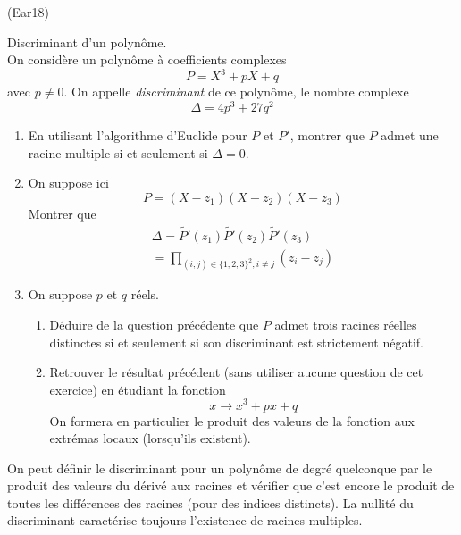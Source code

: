 \begin{tiny}(Ear18)\end{tiny} Discriminant d'un polynôme.\\
On considère un polynôme à coefficients complexes
\begin{displaymath}
 P = X^3 +pX+q
\end{displaymath}
avec $p\neq 0$. On appelle \emph{discriminant} de ce polynôme, le nombre complexe
\begin{displaymath}
 \Delta = 4p^3 + 27q^2
\end{displaymath}
\begin{enumerate}
 \item En utilisant l'algorithme d'Euclide pour $P$ et $P'$, montrer que $P$ admet une racine multiple si et seulement si $\Delta =0$.
 \item On suppose ici
\begin{displaymath}
 P = (X-z_1)(X-z_2)(X-z_3)
\end{displaymath}
 Montrer que
\begin{multline*}
 \Delta = \widetilde{P'}(z_1)\widetilde{P'}(z_2)\widetilde{P'}(z_3)\\
 = \prod_{(i,j)\in\{1,2,3\}^2,i\neq j} (z_i-z_j)
\end{multline*}

\item On suppose $p$ et $q$ réels.
\begin{enumerate}
 \item Déduire de la question précédente que $P$ admet trois racines réelles distinctes si et seulement si son discriminant est strictement négatif.
 \item Retrouver le résultat précédent (sans utiliser aucune question de cet exercice) en étudiant la fonction
\begin{displaymath}
 x\rightarrow x^3+px+q
\end{displaymath}
On formera en particulier le produit des valeurs de la fonction aux extrémas locaux (lorsqu'ils existent).
\end{enumerate}
\end{enumerate}
On peut définir le discriminant pour un polynôme de degré quelconque par le produit des valeurs du dérivé aux racines et vérifier que c'est encore le produit de toutes les différences des racines (pour des indices distincts). La nullité du discriminant caractérise toujours l'existence de racines multiples.
